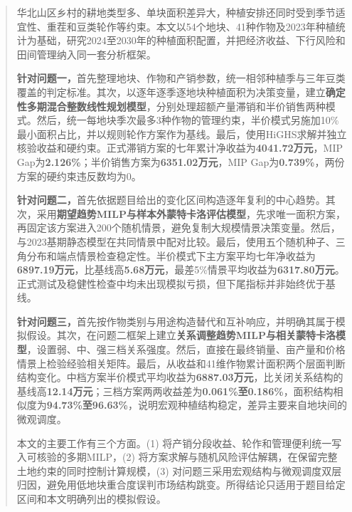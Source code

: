 
\begin{abstract}
  华北山区乡村的耕地类型多、单块面积差异大，种植安排还同时受到季节适宜性、重茬和豆类轮作等约束。本文以54个地块、41种作物及2023年种植统计为基础，研究2024至2030年的种植面积配置，并把经济收益、下行风险和田间管理纳入同一套分析框架。

  \textbf{针对问题一，}首先整理地块、作物和产销参数，统一相邻种植季与三年豆类覆盖的判定标准。其次，以逐年逐季逐地块种植面积为决策变量，建立\textbf{确定性多期混合整数线性规划模型}，分别处理超额产量滞销和半价销售两种模式。然后，统一每地块季次最多3种作物的管理约束，半价模式另施加10\%最小面积占比，并以规则轮作方案作为基线。最后，使用HiGHS求解并独立核验收益和硬约束。正式滞销方案的七年累计净收益为\textbf{4041.72万元}，MIP Gap为\textbf{2.126\%}；半价销售方案为\textbf{6351.02万元}，MIP Gap为\textbf{0.739\%}，两份方案的硬约束违反数均为0。

  \textbf{针对问题二，}首先依据题目给出的变化区间构造逐年复利的中心趋势。其次，采用\textbf{期望趋势MILP与样本外蒙特卡洛评估模型}，先求唯一面积方案，再固定该方案进入200个随机情景，避免复制大规模情景决策变量。然后，与2023基期静态模型在共同情景中配对比较。最后，使用五个随机种子、三角分布和端点情景检查稳定性。半价模式下主方案平均七年净收益为\textbf{6897.19万元}，比基线高\textbf{5.68万元}，最差5\%情景平均收益为\textbf{6317.80万元}。正式测试及稳健性检查中均未出现模拟亏损，但下尾指标并非始终优于基线。

  \textbf{针对问题三，}首先按作物类别与用途构造替代和互补响应，并明确其属于模拟假设。其次，在问题二框架上建立\textbf{关系调整趋势MILP与相关蒙特卡洛模型}，设置弱、中、强三档关系强度。然后，直接在最终销量、亩产量和价格情景上检验经验相关矩阵。最后，从收益和41维作物累计面积两个层面判断结构变化。中档方案半价模式平均收益为\textbf{6887.03万元}，比关闭关系结构的基线高\textbf{12.14万元}；三档方案两两收益差为\textbf{0.061\%至0.186\%}，面积结构相似度为\textbf{94.73\%至96.63\%}，说明宏观种植结构稳定，差异主要来自地块间的微观调度。

  本文的主要工作有三个方面。(1) 将产销分段收益、轮作和管理便利统一写入可核验的多期MILP，(2) 将方案求解与随机风险评估解耦，在保留完整土地约束的同时控制计算规模，(3) 对问题三采用宏观结构与微观调度双层归因，避免用低地块重合度误判市场结构跳变。所得结论只适用于题目给定区间和本文明确列出的模拟假设。

\end{abstract}
